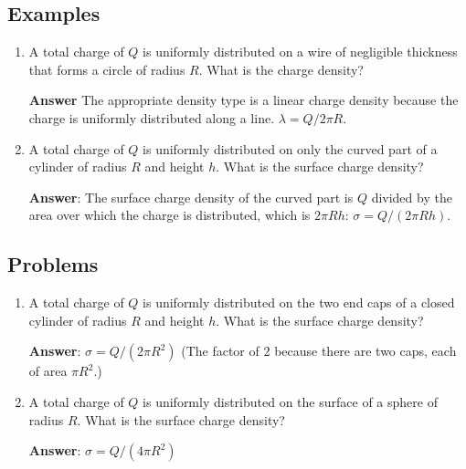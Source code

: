 \documentclass{article}
\begin{document}
\subsection{Examples}

\begin{enumerate}

  \item A total charge of $Q$ is uniformly distributed on a wire of negligible thickness that forms a circle of radius $R$. What is the charge density?

        \textbf{Answer} The appropriate density type is a linear charge density because the charge is uniformly distributed along a line. $\lambda=Q/2\pi R$.

  \item A total charge of $Q$ is uniformly distributed on only the curved part of a cylinder of radius $R$ and height $h$. What is the surface charge density?

        \textbf{Answer}: The surface charge density of the curved part is $Q$ divided by the area over which the charge is distributed, which is $2\pi R h$: $\sigma=Q/(2\pi R  h)$.

\end{enumerate}

\newpage

\subsection{Problems}

\begin{enumerate}

  \item A total charge of $Q$ is uniformly distributed on the two end caps of a closed cylinder of radius $R$ and height $h$. What is the surface charge density?

        \ifsolutions
        \textbf{Answer}: $\sigma = Q/ (2 \pi R^2)$ (The factor of $2$ because there are two caps, each of area $\pi R^2$.)
        \else
        \vskip 72pt
        \fi

  \item A total charge of $Q$ is uniformly distributed on the surface of a sphere of radius $R$. What is the surface charge density?

        \ifsolutions
        \textbf{Answer}: $\sigma = Q/ (4 \pi R^2)$
        \else
        \vskip 72pt
        \fi

\end{enumerate}
\end{document}
